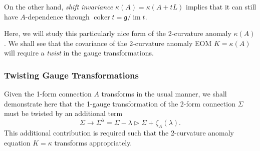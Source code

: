 \documentclass[onecolumn]{article}
\theoremstyle{theorem}
\theoremstyle{remark}
\theoremstyle{example}
\theoremstyle{definition}
\numberwithin{equation}{section}
\def\g{\mathfrak g}
\begin{document}
On the other hand, {\it {shift invariance}} $\kappa(A) = \kappa(A+tL)$ implies that it can still have $A$-dependence through $\operatorname{coker}t=\g/\operatorname{im}t$.


Here, we will study this particularly nice form of the 2-curvature anomaly $\kappa(A)$. We shall see that the covariance of the 2-curvature anomaly EOM $K=\kappa(A)$ will require a \textit{{twist}} in the gauge transformations. 

\subsubsection{Twisting Gauge Transformations} Given the 1-form connection $A$ transforms in the usual manner, we shall demonstrate here that the 1-gauge transformation of the 2-form connection $\Sigma$ must be twisted by an additional term
\begin{equation}
    \Sigma\rightarrow \Sigma^\lambda =\Sigma -\lambda\rhd\Sigma + \zeta_A(\lambda).\label{twisted1gau}
\end{equation}
{This} additional contribution is required such that the 2-curvature anomaly equation $K=\kappa$ transforms appropriately. 
\end{document}
